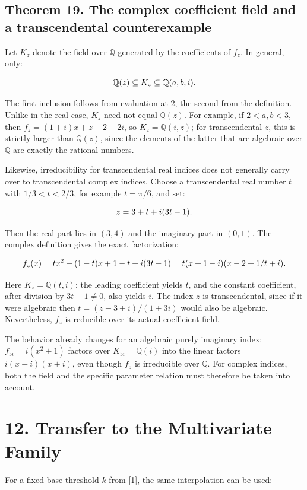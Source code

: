 \documentclass[11pt,a4paper]{article}
\newcommand{\fitmath}[1]{\begingroup\setbox0=\hbox{$\displaystyle #1$}\ifdim\wd0>\linewidth\resizebox{\linewidth}{!}{\box0}\else\box0\fi\endgroup}
\begin{document}
\subsection*{Theorem 19. The complex coefficient field and a transcendental counterexample}

Let $K_z$ denote the field over $\mathbb Q$ generated by the coefficients of $f_z$. In general, only:


\[
\fitmath{\mathbb Q(z)\subseteq K_z\subseteq\mathbb Q(a,b,i).}
\]


The first inclusion follows from evaluation at 2, the second from the definition. Unlike in the real case, $K_z$ need not equal $\mathbb Q(z)$. For example, if $2<a,b<3$, then $f_z=(1+i)x+z-2-2i$, so $K_z=\mathbb Q(i,z)$; for transcendental $z$, this is strictly larger than $\mathbb Q(z)$, since the elements of the latter that are algebraic over $\mathbb Q$ are exactly the rational numbers.


Likewise, irreducibility for transcendental real indices does not generally carry over to transcendental complex indices. Choose a transcendental real number $t$ with $1/3<t<2/3$, for example $t=\pi/6$, and set:


\[
\fitmath{z=3+t+i(3t-1).}
\]


Then the real part lies in $(3,4)$ and the imaginary part in $(0,1)$. The complex definition gives the exact factorization:


\[
\fitmath{f_z(x)=t x^2+(1-t)x+1-t+i(3t-1)=t(x+1-i)(x-2+1/t+i).}
\]


Here $K_z=\mathbb Q(t,i)$: the leading coefficient yields $t$, and the constant coefficient, after division by $3t-1\ne0$, also yields $i$. The index $z$ is transcendental, since if it were algebraic then $t=(z-3+i)/(1+3i)$ would also be algebraic. Nevertheless, $f_z$ is reducible over its actual coefficient field.


The behavior already changes for an algebraic purely imaginary index: $f_{5i}=i(x^2+1)$ factors over $K_{5i}=\mathbb Q(i)$ into the linear factors $i(x-i)(x+i)$, even though $f_5$ is irreducible over $\mathbb Q$. For complex indices, both the field and the specific parameter relation must therefore be taken into account.


\section*{12. Transfer to the Multivariate Family}

For a fixed base threshold $k$ from [1], the same interpolation can be used:
\end{document}
